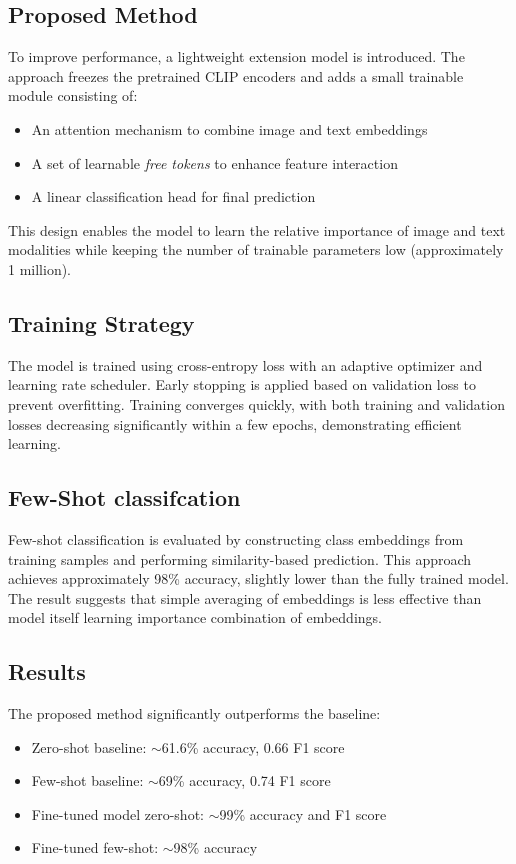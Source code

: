 \subsection{Proposed Method}
To improve performance, a lightweight extension model is introduced. The approach freezes the pretrained CLIP encoders and adds a small trainable module consisting of:
\begin{itemize}
    \item An attention mechanism to combine image and text embeddings
    \item A set of learnable \textit{free tokens} to enhance feature interaction
    \item A linear classification head for final prediction
\end{itemize}

This design enables the model to learn the relative importance of image and text modalities while keeping the number of trainable parameters low (approximately 1 million).

\subsection{Training Strategy}
The model is trained using cross-entropy loss with an adaptive optimizer and learning rate scheduler. Early stopping is applied based on validation loss to prevent overfitting. Training converges quickly, with both training and validation losses decreasing significantly within a few epochs, demonstrating efficient learning.

\subsection{Few-Shot classifcation}
Few-shot classification is evaluated by constructing class embeddings from training samples and performing similarity-based prediction. This approach achieves approximately 98\% accuracy, slightly lower than the fully trained model. The result suggests that simple averaging of embeddings is less effective than model itself learning importance combination of embeddings.

\subsection{Results}
The proposed method significantly outperforms the baseline:
\begin{itemize}
    \item Zero-shot baseline: $\sim$61.6\% accuracy, 0.66 F1 score
    \item Few-shot baseline: $\sim$69\% accuracy, 0.74 F1 score
    \item Fine-tuned model zero-shot: $\sim$99\% accuracy and F1 score
    \item Fine-tuned few-shot: $\sim$98\% accuracy
\end{itemize}

